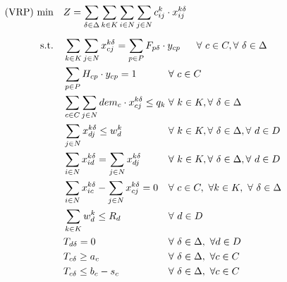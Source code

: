 \documentclass[preprint,review,12pt]{elsarticle}
\begin{document}
\begin{align}
	\text{(VRP) min} \quad      & Z = \sum\limits_{\delta\in \Delta} \sum\limits_{k\in K}\sum\limits_{i\in N}\sum\limits_{j\in N} c_{ij}^k \cdot x_{ij}^{k\delta}    && \label{PCVRP_FObj}    \\[5pt]
	\noindent \text{s.t.} \quad & \sum\limits_{k \in K}\sum\limits_{j \in N} x_{cj}^{k\delta} = \sum\limits_{p \in P} F_{p\delta} \cdot y_{cp}    && \text{\hspace{-0cm}} \forall \ c \in C, \forall \ \delta \in \Delta \label{PCVRP_Service} \\
	& \sum\limits_{p \in P} H_{cp} \cdot y_{cp} = 1                 && \text{\hspace{-1cm}} \forall \ c \in C  \label{PCVRP_Freq} \\
	& \sum\limits_{c \in C}\sum\limits_{j \in N}dem_{c} \cdot x_{cj}^{k\delta} \leq q_k                 && \text{\hspace{-1cm}} \forall \ k \in K, \forall \ \delta \in \Delta  \label{PCVRP_Capacity} \\
	& \sum\limits_{j \in N}x_{dj}^{k\delta} \leq w_d^k && \text{\hspace{-1cm}} \forall \ k \in K, \forall \ \delta \in \Delta, \forall \ d \in D \label{PCVRP_StartRoute} \\
	& \sum\limits_{i \in N}x_{id}^{k\delta} =    \sum\limits_{j \in N}x_{dj}^{k\delta} && \text{\hspace{-1cm}} \forall \ k \in K, \forall \ \delta \in \Delta, \forall \ d \in D \label{PCVRP_EndRoute} \\
	& \sum\limits_{i \in N}x_{ic}^{k\delta} - \sum\limits_{j \in N}x_{cj}^{k\delta} = 0             && \text{\hspace{-1cm}} \forall \ c \in C,\ \forall k \in K,\ \forall \ \delta \in \Delta \label{PCVRP_Balance} \\
	& \sum\limits_{k \in K}w_d^k \leq R_d                                     && \text{\hspace{-1cm}} \forall \ d \in D \label{PCVRP_CapacityD} \\
	& T_{d\delta} = 0  && \text{\hspace{-1cm}} \forall \ \delta \in \Delta, \ \forall d \in D \label{PCVRP_InitialT}\\
	& T_{c\delta} \geq a_c  && \text{\hspace{-1cm}} \forall \ \delta \in \Delta, \ \forall c \in C \label{PCVRP_ArriveT}\\
	& T_{c\delta} \leq b_c - s_c && \text{\hspace{-1cm}} \forall \ \delta \in \Delta, \ \forall c \in C \label{PCVRP_DepartT}
\end{align}
\end{document}
